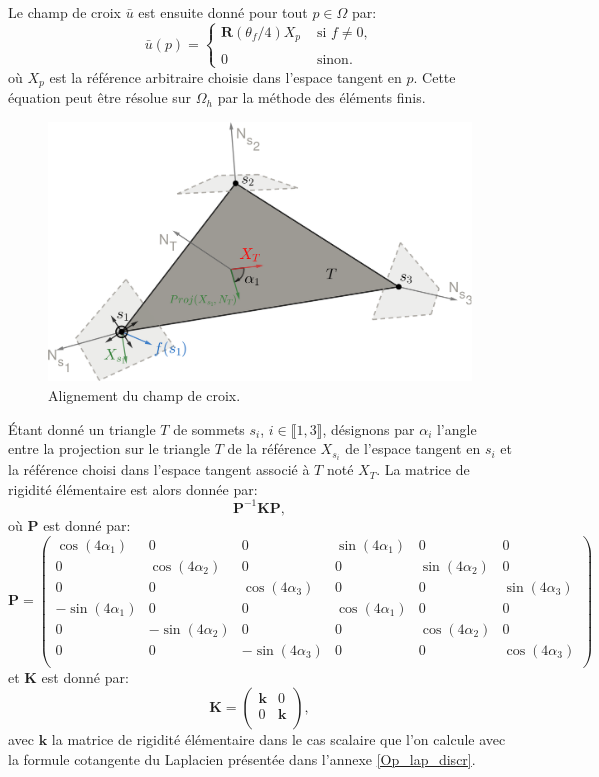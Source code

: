 Le champ de croix $\bar{u}$ est ensuite donné pour tout $p\in\Omega$ par:
$$
\bar{u}(p)=
\left\{
\begin{array}{ll}
\mathbf{R}(\theta_f/4)X_p& \mbox{ si }f\neq 0,\\\\
0&\mbox{ sinon}.
\end{array}
\right.
$$
où $X_p$ est la référence arbitraire choisie dans l'espace tangent en $p$. Cette équation peut être résolue sur $\Omega_h$ par la méthode des éléments finis.
\begin{figure}[!h]
\centering
\includegraphics[scale=0.45]{images/triangle_space_laplace.pdf}
\caption{Alignement du champ de croix.}
\label{triangle_space_laplace}
\end{figure}
Étant donné un triangle $T$ de sommets $s_i$, $i\in\llbracket1, 3\rrbracket$, désignons par $\alpha_i$ l'angle entre la projection sur le triangle $T$ de la référence $X_{s_i}$ de l'espace tangent en $s_i$ et la référence choisi dans l'espace tangent associé à $T$ noté $X_T$. La matrice de rigidité élémentaire est alors donnée par:
$$
\mathbf{P}^{-1}\mathbf{K}\mathbf{P},
$$
où $\mathbf{P}$ est donné par:
$$
\mathbf{P}=
\begin{pmatrix}
\cos(4\alpha_1) & 0 & 0 & \sin(4\alpha_1) & 0 & 0 \\
0 & \cos(4\alpha_2) & 0 & 0 & \sin(4\alpha_2) & 0 \\
0 & 0 & \cos(4\alpha_3) & 0 & 0 & \sin(4\alpha_3) \\
-\sin(4\alpha_1) & 0 & 0 & \cos(4\alpha_1) & 0 & 0 \\
0 & -\sin(4\alpha_2) & 0 & 0 & \cos(4\alpha_2) & 0 \\
0 & 0 & -\sin(4\alpha_3) & 0 & 0 & \cos(4\alpha_3) \\
\end{pmatrix}
$$
et $\mathbf{K}$ est donné par:
$$
\mathbf{K}=
\begin{pmatrix}
\mathbf{k} & 0 \\
0 & \mathbf{k} \\
\end{pmatrix},
$$
avec $\mathbf{k}$ la matrice de rigidité élémentaire dans le cas scalaire que l'on calcule avec la formule cotangente du Laplacien présentée dans l'annexe \ref{Op_lap_discr}.



